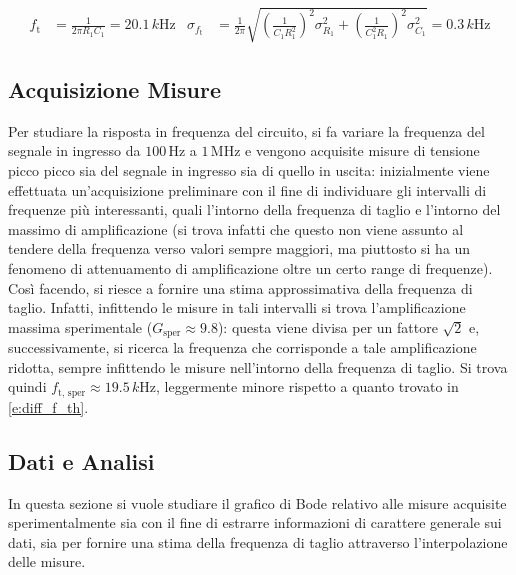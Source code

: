\documentclass[a4paper,11pt]{article} %
\begin{document}
\begin{align}\label{e:diff_f_th}
	f_{\text{t}}&=\frac{1}{2\pi R_{1}C_{1}}=20.1 \,\si{k\Hz} & \sigma_{f_{\text{t}}}&=\frac{1}{2\pi}\sqrt{	\left(\frac{1}{C_{1}R_{1}^2}\right)^2\sigma_{R_{1}}^2	+
																	\left(\frac{1}{C_{1}^2R_{1}}\right)^2\sigma_{C_{1}}^2   }
																	= 0.3 \,\si{k\Hz}	
\end{align}



\subsection{Acquisizione Misure}
Per studiare la risposta in frequenza del circuito, si fa variare la frequenza del segnale in ingresso da
$100\,\si{\Hz}$ a $1\,\si{\MHz}$ e vengono acquisite misure di tensione picco picco sia del segnale in ingresso sia di
quello in uscita: inizialmente viene effettuata un'acquisizione preliminare con il fine di individuare gli intervalli di
frequenze più interessanti, quali l'intorno della frequenza di taglio e l'intorno del massimo di amplificazione (si
trova infatti che questo non viene assunto al tendere della frequenza verso valori sempre maggiori, ma piuttosto si ha
un fenomeno di attenuamento di amplificazione oltre un certo range di frequenze). Così facendo, si riesce a fornire una
stima approssimativa della frequenza di taglio. Infatti, infittendo le misure in tali intervalli si trova
l'amplificazione massima sperimentale ($G_{\text{sper}}\approx 9.8$): questa viene divisa per un fattore $\sqrt{2}$ e,
successivamente, si ricerca la frequenza che corrisponde a tale amplificazione ridotta, sempre infittendo le misure
nell'intorno della frequenza di taglio. Si trova quindi $f_{\text{t, sper}}\approx 19.5\,\si{k\Hz}$, leggermente minore
rispetto a quanto trovato in \autoref{e:diff_f_th}.



\subsection{Dati e Analisi}
In questa sezione si vuole studiare il grafico di Bode relativo alle misure acquisite sperimentalmente sia con il fine di estrarre
informazioni di carattere generale sui dati, sia per fornire una stima della frequenza di taglio attraverso
l'interpolazione delle misure.
\end{document}
